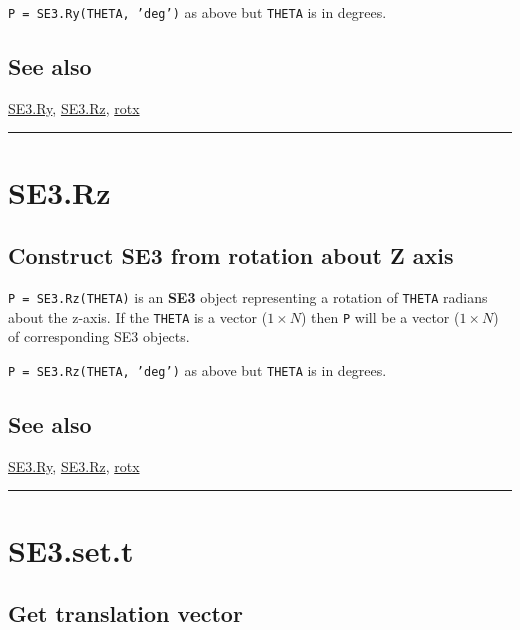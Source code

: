 \texttt{P = SE3.Ry(THETA, 'deg')} as above but \texttt{THETA} is in degrees.


\subsection*{See also}


\hyperlink{SE3.Ry}{\color{blue} SE3.Ry}, \hyperlink{SE3.Rz}{\color{blue} SE3.Rz}, \hyperlink{rotx}{\color{blue} rotx}

\vspace{1.5ex}\hrule

\hypertarget{SE3.Rz}{\section*{SE3.Rz}}
\subsection*{Construct SE3 from rotation about Z axis}


\texttt{P = SE3.Rz(THETA)} is an \textbf{\color{red} SE3} object representing a rotation of \texttt{THETA}
radians about the z-axis.  If the \texttt{THETA} is a vector ($1 \times N$) then \texttt{P} will be
a vector ($1 \times N$) of corresponding SE3 objects.



\texttt{P = SE3.Rz(THETA, 'deg')} as above but \texttt{THETA} is in degrees.


\subsection*{See also}


\hyperlink{SE3.Ry}{\color{blue} SE3.Ry}, \hyperlink{SE3.Rz}{\color{blue} SE3.Rz}, \hyperlink{rotx}{\color{blue} rotx}

\vspace{1.5ex}\hrule

\hypertarget{SE3.set.t}{\section*{SE3.set.t}}
\subsection*{Get translation vector}


